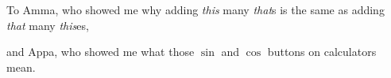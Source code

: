 \documentclass{ucbthesis}
\begin{document}
\begin{frontmatter}

\begin{dedication}
\null\vfil
\begin{center}
To Amma, who showed me why adding \textit{this} many \textit{that}s is the same as adding \textit{that} many \textit{this}es,
\\\vspace{12pt}

and Appa, who showed me what those $\sin$ and $\cos$ buttons on calculators mean.

\end{center}
\vfil\null
\end{dedication}

\tableofcontents

\begin{acknowledgements}
\end{acknowledgements}

\end{frontmatter}

\setcounter{section}{-1}








\printbibliography

\printindex


% 
\end{document}
